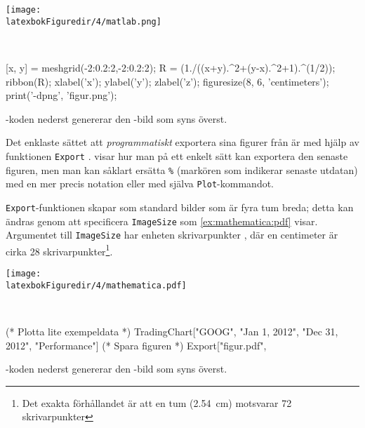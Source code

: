 \documentclass[lang=sv,ptsize=10pt,font=none,nomath,titles=bf,../../a4.tex]{subfiles}
\begin{document}
\begin{kod}[tbp]
	\centering
	\begin{minipage}{\textwidth}
		\centering
		\texttt{[image: \\latexbokFiguredir/4/matlab.png]}
	\end{minipage}
	\\[2ex]
	\begin{minipage}{\textwidth}
		\begin{matlabcode}
[x, y] = meshgrid(-2:0.2:2,-2:0.2:2);
R = (1./((x+y).^2+(y-x).^2+1).^(1/2));
ribbon(R);
xlabel('x'); ylabel('y'); zlabel('z');
figuresize(8, 6, 'centimeters');
print('-dpng', 'figur.png');
		\end{matlabcode}
	\end{minipage}
	\caption{\MATLAB-koden nederst genererar den \PNG-bild som
	syns överst.}
	\label{ex:matlab:png}
\end{kod}

Det enklaste sättet att \emph{programmatiskt} exportera sina figurer
från \Mathematica är med hjälp av funktionen \texttt{Export}
\parencite{Wolfram13a}.  visar hur man på ett
enkelt sätt kan exportera den senaste figuren, men man kan såklart
ersätta \texttt{\%} (markören som indikerar senaste utdatan) med
en mer precis notation
\parencite[se dokumentationen för \texttt{Out}][]{Wolfram13b}
eller med själva \texttt{Plot}-kommandot.

\texttt{Export}-funktionen skapar som standard bilder som är fyra
tum breda; detta kan ändras genom att specificera \texttt{ImageSize}
som \cref{ex:mathematica:pdf} visar. Argumentet till \texttt{ImageSize}
har enheten skrivarpunkter , där en centimeter
är cirka 28 skrivarpunkter\footnote{Det exakta förhållandet är att en
tum (\SI{2.54}{\centi\metre}) motsvarar 72 skrivarpunkter}.

\begin{kod}[tbp]
	\centering
	\begin{minipage}{\textwidth}
		\centering
		\texttt{[image: \\latexbokFiguredir/4/mathematica.pdf]}
	\end{minipage}
	\\[2ex]
	\begin{minipage}{\textwidth}
		\begin{matlabcode}
(* Plotta lite exempeldata *)
TradingChart[{"GOOG", {"Jan 1, 2012", 
   "Dec 31, 2012"}}, {"Performance"}]
(* Spara figuren *)
Export["figur.pdf", %
		\end{matlabcode}
	\end{minipage}
	\caption{\Mathematica-koden nederst genererar den \PDF-bild som
	syns överst.}
	\label{ex:mathematica:pdf}
\end{kod}
\end{document}
